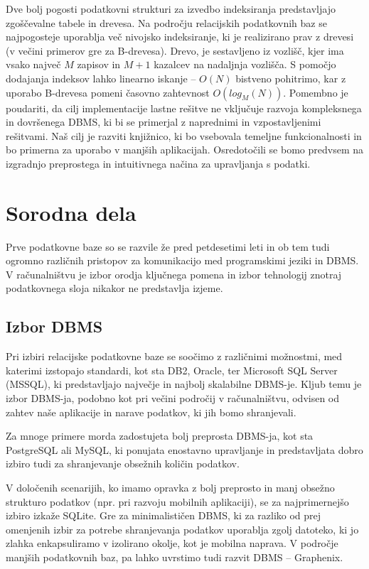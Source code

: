\documentclass[a4paper,12pt,openright]{book}
\begin{document}
    Dve bolj pogosti podatkovni strukturi za izvedbo indeksiranja predstavljajo zgoščevalne tabele in drevesa. Na področju relacijskih podatkovnih baz se najpogosteje uporablja več nivojsko indeksiranje, ki je realizirano prav z drevesi (v večini primerov gre za B-drevesa). Drevo, je sestavljeno iz vozlišč, kjer ima vsako največ $M$ zapisov in $M+1$ kazalcev na nadaljnja vozlišča. S pomočjo dodajanja indeksov lahko linearno iskanje – $O(N)$ bistveno pohitrimo, kar z uporabo B-drevesa pomeni časovno zahtevnost $O(log_M(N))$.
    \newline
    \newline
    \noindent
    Pomembno je poudariti, da cilj implementacije lastne rešitve ne vključuje razvoja kompleksnega in dovršenega DBMS, ki bi se primerjal z naprednimi in vzpostavljenimi rešitvami. Naš cilj je razviti knjižnico, ki bo vsebovala temeljne funkcionalnosti in bo primerna za uporabo v manjših aplikacijah. Osredotočili se bomo predvsem na izgradnjo preprostega in intuitivnega načina za upravljanja s podatki.

\chapter{Sorodna dela}

    Prve podatkovne baze so se razvile že pred petdesetimi leti in ob tem tudi ogromno različnih pristopov za komunikacijo med programskimi jeziki in DBMS. V računalništvu je izbor orodja ključnega pomena in izbor tehnologij znotraj podatkovnega sloja nikakor ne predstavlja izjeme.

    \section{Izbor DBMS}
    Pri izbiri relacijske podatkovne baze se soočimo z različnimi možnostmi, med katerimi izstopajo standardi, kot sta DB2, Oracle, ter Microsoft SQL Server (MSSQL), ki predstavljajo največje in najbolj skalabilne DBMS-je. Kljub temu je izbor DBMS-ja, podobno kot pri večini področij v računalništvu, odvisen od zahtev naše aplikacije in narave podatkov, ki jih bomo shranjevali.

    Za mnoge primere morda zadostujeta bolj preprosta DBMS-ja, kot sta PostgreSQL ali MySQL, ki ponujata enostavno upravljanje in predstavljata dobro izbiro tudi za shranjevanje obsežnih količin podatkov. 
    
    V določenih scenarijih, ko imamo opravka z bolj preprosto in manj obsežno strukturo podatkov (npr. pri razvoju mobilnih aplikaciji), se za najprimernejšo izbiro izkaže SQLite. Gre za minimalističen DBMS, ki za razliko od prej omenjenih izbir za potrebe shranjevanja podatkov uporablja zgolj datoteko, ki jo zlahka enkapsuliramo v izolirano okolje, kot je mobilna naprava. V področje manjših podatkovnih baz, pa lahko uvrstimo tudi razvit DBMS – Graphenix\cite{GRAPHENIX_GITHUB}.
    
\end{document}
